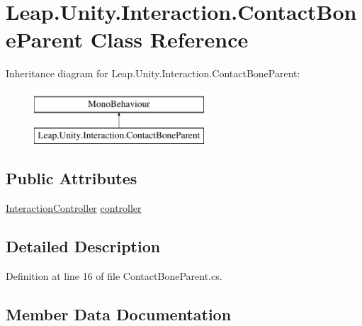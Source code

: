 \hypertarget{class_leap_1_1_unity_1_1_interaction_1_1_contact_bone_parent}{}\section{Leap.\+Unity.\+Interaction.\+Contact\+Bone\+Parent Class Reference}
\label{class_leap_1_1_unity_1_1_interaction_1_1_contact_bone_parent}
Inheritance diagram for Leap.\+Unity.\+Interaction.\+Contact\+Bone\+Parent\+:\begin{figure}[H]
\begin{center}
\leavevmode
\includegraphics[height=2.000000cm]{class_leap_1_1_unity_1_1_interaction_1_1_contact_bone_parent}
\end{center}
\end{figure}
\subsection*{Public Attributes}
\begin{DoxyCompactItemize}
\item 
\mbox{\hyperlink{class_leap_1_1_unity_1_1_interaction_1_1_interaction_controller}{Interaction\+Controller}} \mbox{\hyperlink{class_leap_1_1_unity_1_1_interaction_1_1_contact_bone_parent_a535222c923c8d491b39216cb899080ee}{controller}}
\end{DoxyCompactItemize}


\subsection{Detailed Description}


Definition at line 16 of file Contact\+Bone\+Parent.\+cs.



\subsection{Member Data Documentation}
\mbox{\label{class_leap_1_1_unity_1_1_interaction_1_1_contact_bone_parent_a535222c923c8d491b39216cb899080ee}} 
